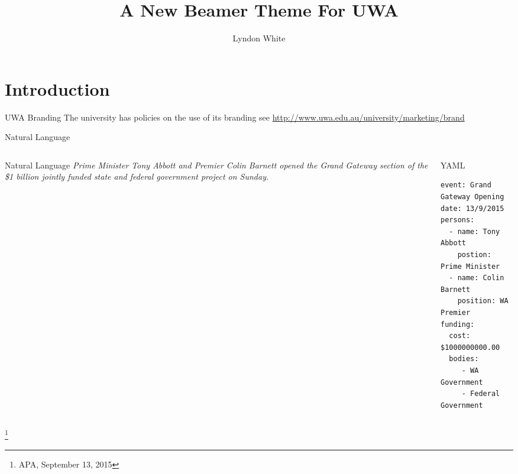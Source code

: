 \documentclass[12pt,landscape,english]{beamer}
\begin{document}

\title[Beamer Theme]{A New Beamer Theme For UWA}
\author[L.~White]{Lyndon White}

\date{}

\begin{frame}[plain]
	\titlepage
\end{frame}



\section{Introduction}

\begin{frame}{UWA Branding}
	The university has policies on the use of its branding
	see \url{http://www.uwa.edu.au/university/marketing/brand}
\end{frame}

\begin{frame}[fragile] {Natural Language} 
	\begin{columns}[T]
		\begin{column}{0.5\textwidth}
			 \begin{block}{Natural Language}
			 	\textit{Prime Minister Tony Abbott and Premier Colin Barnett opened the Grand Gateway section of the \$1 billion jointly funded state and federal government project on Sunday.}
			 \end{block}
		\end{column}
		
		\begin{column}{0.5\textwidth}
			\begin{block}{YAML}
				\scriptsize
			 	\begin{verbatim}
event: Grand Gateway Opening
date: 13/9/2015
persons:
  - name: Tony Abbott
    postion: Prime Minister
  - name: Colin Barnett
    position: WA Premier
funding:
  cost: $1000000000.00
  bodies:
     - WA Government
     - Federal Government
			 	\end{verbatim}
			 \end{block}
		\end{column}
	\end{columns}
	
	\footnote{APA, September 13, 2015}
\end{frame}
\end{document}
